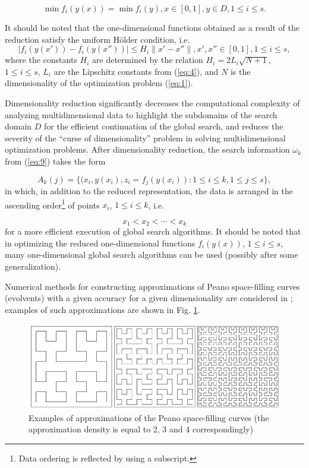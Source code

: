 \documentclass[review]{elsarticle}
\begin{document}
\begin{equation}\label{eq:11}
\min {f_i (y(x))} = \min{f_i (y)}, x \in [0,1], y \in D, 1 \leq i \leq s.
\end{equation}

It should be noted that the one-dimensional functions obtained as a result of the reduction satisfy the uniform H\"older condition, i.e.
\begin{equation}\label{eq:12}
|f_i (y(x'))-f_i (y(x''))| \leq H_i \|x'-x''\|, x',x''\in [0,1], 1 \leq i \leq s,
\end{equation}
where the constants $H_i$ are determined by the relation $H_i = 2L_i \sqrt{N+1}$, ${1 \leq i \leq s}$, $L_i$ are the Lipschitz constants from (\ref{eq:4}), and $N$ is the dimensionality of the optimization problem (\ref{eq:1}).

Dimensionality reduction significantly decreases the computational complexity of analyzing multidimensional data to highlight the subdomains of the search domain $D$ for the efficient continuation of the global search, and reduces the severity of the ``curse of dimensionality'' problem in solving multidimensional optimization problems. After dimensionality reduction, the search information $\omega_k$ from (\ref{eq:9}) takes the form

\begin{equation}\label{eq:13}
A_k (j)=\{ (x_i, y(x_i), z_i=f_j (y(x_i) ): 1 \leq i \leq k,1 \leq j \leq s \},
\end{equation}
in which, in addition to the reduced representation, the data is arranged in the ascending order\footnote{Data ordering is reflected by using a subscript.} of points $x_i$,  $1 \leq i \leq k$, i.e.

\begin{equation}\label{eq:14}
x_1< x_2< \cdots < x_k
\end{equation}
for a more efficient execution of global search algorithms. It should be noted that in optimizing the reduced one-dimensional functions $f_i (y(x))$, $1 \leq i \leq s$, many one-dimensional global search algorithms can be used (possibly after some generalization).

Numerical methods for constructing approximations of Peano space-filling curves (evolvents) with a given accuracy for a given dimensionality are considered in \cite{c5}; examples of such approximations are shown in Fig. \ref{fig:1}.

\begin{figure}
  \centering
  \includegraphics[width=\linewidth]{fig1}
  \caption{Examples of approximations of the Peano space-filling curves (the approximation density is equal to 2, 3 and 4 correspondingly) \cite{c5}}
  \label{fig:1}
\end{figure}
\end{document}
